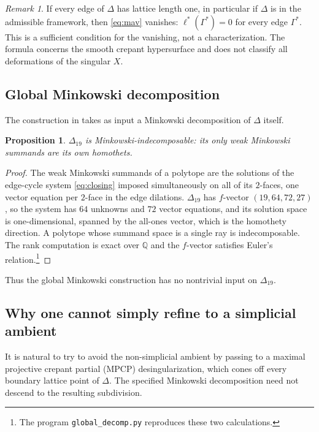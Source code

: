 \documentclass[11pt]{amsart}
\newtheorem{proposition}[theorem]{Proposition}
\theoremstyle{definition}
\theoremstyle{remark}
\newtheorem{remark}[theorem]{Remark}
\theoremstyle{plain}
\newcommand{\QQ}{\mathbb{Q}}
\begin{document}
\begin{remark}\label{prop:mavempty}
If every edge of $\Delta$ has lattice length one, in particular if $\Delta$
is in the admissible framework, then \eqref{eq:mav} vanishes: $\ell^*(\Gamma^*)=0$ for every
edge $\Gamma^*$.  This is a sufficient condition for the vanishing,
not a characterization.  The formula concerns the smooth crepant
hypersurface and does not classify all deformations of the singular $X$.
\end{remark}

\subsection{Global Minkowski decomposition}
The construction in \cite[\S7, Thm.~7.1]{Mav09} takes as input a Minkowski
decomposition of $\Delta$ itself.

\begin{proposition}\label{prop:globalindec}
$\Delta_{19}$ is Minkowski-indecomposable: its only weak Minkowski summands are
its own homothets.
\end{proposition}

\begin{proof}
The weak Minkowski summands of a polytope are the solutions of the edge-cycle
system \eqref{eq:closing} imposed simultaneously on all of its $2$-faces, one
vector equation per $2$-face in the edge dilations.  $\Delta_{19}$ has $f$-vector
$(19,64,72,27)$, so the system has $64$ unknowns and $72$ vector equations, and
its solution space is one-dimensional, spanned by the all-ones vector, which is
the homothety direction.  A polytope whose summand space is a single ray is
indecomposable.  The rank computation is exact over $\QQ$ and
the $f$-vector satisfies Euler's relation.\footnote{The program
\texttt{global\_decomp.py} reproduces these two calculations.}
\end{proof}

Thus the global Minkowski construction has no nontrivial input on
$\Delta_{19}$.

\subsection{Why one cannot simply refine to a simplicial ambient}\label{sec:mpcp}
It is natural to try to avoid the non-simplicial ambient by passing to a
maximal projective crepant partial (MPCP) desingularization, which cones off
every boundary lattice point of $\Delta$.  The specified Minkowski
decomposition need not descend to the resulting subdivision.
\end{document}
